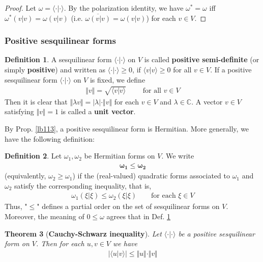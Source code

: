 \documentclass[12pt,b5paper,notitlepage]{article}
\theoremstyle{definition}
\newtheorem{df}{Definition}[subsection]
\theoremstyle{plain}
\newtheorem{thm}[df]{Theorem}
\newcommand{\ovl}{\overline}
\newcommand{\bk}[1]{\langle {#1}\rangle}
\newcommand{\Cbb}{\mathbb C}
\numberwithin{equation}{section}
\begin{document}
\begin{proof}
Let $\omega=\bk{\cdot|\cdot}$. By the polarization identity, we have $\omega^*=\omega$ iff $\omega^*(v|v)=\omega(v|v)$ (i.e. $\ovl{\omega(v|v)}=\omega(v|v)$) for each $v\in V$. 
\end{proof}


\subsubsection{Positive sesquilinear forms}


\begin{df}\label{lb139}
A sesquilinear form $\bk{\cdot|\cdot}$ on $V$ is called \textbf{positive semi-definite} (or simply \textbf{positive}) and written as $\bk{\cdot|\cdot}\geq0$,  if $\bk{v|v}\geq0$ for all $v\in V$. If a positive sesquilinear form $\bk{\cdot|\cdot}$ on $V$ is fixed, we define
\begin{align}
\Vert v\Vert=\sqrt{\bk{v|v}}\qquad\text{ for all }v\in V
\end{align} 
Then it is clear that $\Vert\lambda v\Vert=|\lambda|\cdot\Vert v\Vert$ for each $v\in V$ and $\lambda\in\Cbb$. A vector $v\in V$ satisfying $\Vert v\Vert=1$ is called a \textbf{unit vector}.  
\end{df}

By Prop. \ref{lb113}, a positive sesquilinear form is Hermitian. More generally, we have the following definition:

\begin{df}\label{lb140}
Let $\omega_1,\omega_2$ be Hermitian forms on $V$. We write
\begin{align*}
\pmb{\omega_1\leq\omega_2}
\end{align*}
(equivalently, $\omega_2\geq\omega_1$) if the (real-valued) quadratic forms associated to $\omega_1$ and $\omega_2$ satisfy the corresponding inequality, that is,
\begin{align*}
\omega_1(\xi|\xi)\leq\omega_2(\xi|\xi)\qquad\text{for each }\xi\in V
\end{align*}
Thus, "$\leq$" defines a partial order on the set of sesquilinear forms on $V$. Moreover, the meaning of $0\leq\omega$ agrees that in Def. \ref{lb139}
\end{df}




\begin{thm}[\textbf{Cauchy-Schwarz inequality}] \label{lb165}
Let $\bk{\cdot|\cdot}$ be a positive sesquilinear form on $V$. Then for each $u,v\in V$ we have
\begin{align*}
|\bk{u|v}|\leq\Vert u\Vert\cdot\Vert v\Vert
\end{align*}
\end{thm}
\end{document}
